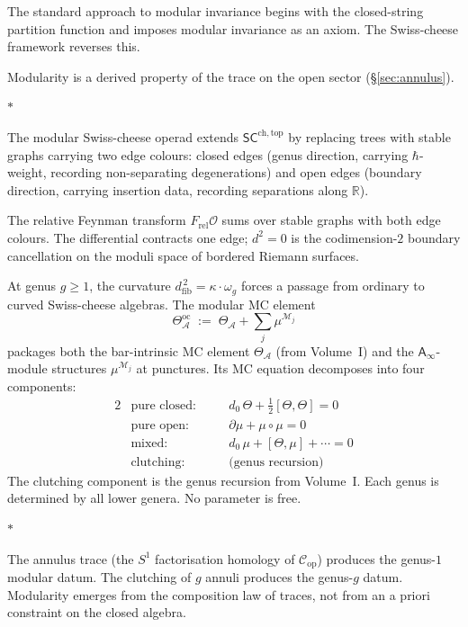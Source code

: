 \documentclass[11pt]{article}
\newcommand{\cA}{\mathcal{A}}
\newcommand{\cC}{\mathcal{C}}
\newcommand{\cM}{\mathcal{M}}
\newcommand{\cO}{\mathcal{O}}
\newcommand{\R}{\mathbb{R}}
\newcommand{\Ainf}{\mathsf{A}_{\infty}}
\newcommand{\SCchtop}{\mathsf{SC}^{\mathrm{ch,top}}}
\newcommand{\dfib}{d_{\mathrm{fib}}}
\newcommand{\sep}{\bigskip\begin{center}$*$\end{center}\medskip}
\begin{document}
The standard approach to modular invariance begins with the
closed-string partition function and imposes modular invariance
as an axiom.  The Swiss-cheese framework reverses this.

Modularity is a derived property of the trace on the open sector
(\S\ref{sec:annulus}).

\sep

The modular Swiss-cheese operad extends $\SCchtop$ by replacing
trees with stable graphs carrying two edge colours: closed
edges (genus direction, carrying $\hbar$-weight, recording
non-separating degenerations) and open edges (boundary direction,
carrying insertion data, recording separations along $\R$).

The relative Feynman transform $F_{\mathrm{rel}}\cO$ sums over
stable graphs with both edge colours.  The differential contracts
one edge; $d^2 = 0$ is the codimension-$2$ boundary cancellation
on the moduli space of bordered Riemann surfaces.

At genus $g \geq 1$, the curvature
$\dfib^{\,2} = \kappa \cdot \omega_g$ forces a passage from
ordinary to curved Swiss-cheese algebras.  The modular MC element
\begin{equation}\label{eq:oc-mc-wn}
\Theta^{\mathrm{oc}}_\cA
\;:=\;
\Theta_\cA + \sum_{j} \mu^{\cM_j}
\end{equation}
packages both the bar-intrinsic MC element $\Theta_\cA$ (from
Volume~I) and the $\Ainf$-module structures $\mu^{\cM_j}$ at
punctures.  Its MC equation decomposes into four components:
\begin{alignat*}{2}
&\text{pure closed:} &&\quad d_0\,\Theta
  + \tfrac{1}{2}[\Theta, \Theta] = 0 \\[3pt]
&\text{pure open:} &&\quad \partial\mu
  + \mu \circ \mu = 0 \\[3pt]
&\text{mixed:} &&\quad d_0\,\mu
  + [\Theta, \mu] + \cdots = 0 \\[3pt]
&\text{clutching:} &&\quad \text{(genus recursion)}
\end{alignat*}
The clutching component is the genus recursion from Volume~I.
Each genus is determined by all lower genera.  No parameter
is free.

\sep

The annulus trace (the $S^1$ factorisation homology of
$\cC_{\mathrm{op}}$) produces the genus-$1$ modular datum.
The clutching of $g$ annuli produces the genus-$g$ datum.
Modularity emerges from the composition law of traces, not
from an a priori constraint on the closed algebra.
\end{document}
